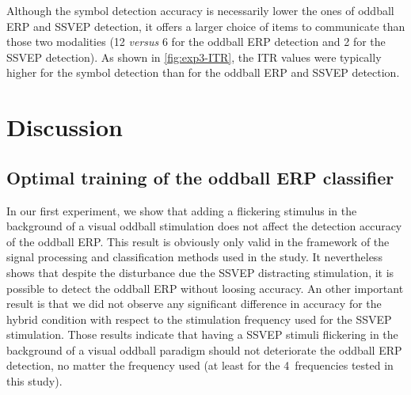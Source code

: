 \documentclass[10pt]{article}
\begin{document}
    Although the symbol detection accuracy is necessarily lower the ones of oddball ERP and SSVEP detection, it offers a larger choice of items to communicate than those two modalities (12 \emph{versus} 6 for the oddball ERP detection and 2 for the SSVEP detection).
    As shown in \autoref{fig:exp3-ITR}, the ITR values were typically higher for the symbol detection than for the oddball ERP and SSVEP detection.



\section{Discussion}
\label{sec:4Discuss}

    \subsection{Optimal training of the oddball ERP classifier}
    \label{sec:4Discuss1}
    In our first experiment, we show that adding a flickering stimulus in the background of a visual oddball stimulation does not affect the detection accuracy of the oddball ERP.
    This result is obviously only valid in the framework of the signal processing and classification methods used in the study.
    It nevertheless shows that despite the disturbance due the SSVEP distracting stimulation, it is possible to detect the oddball ERP without loosing accuracy.
    An other important result is that we did not observe any significant difference in accuracy for the hybrid condition with respect to the stimulation frequency used for the SSVEP stimulation.
    Those results indicate that having a SSVEP stimuli flickering in the background of a visual oddball paradigm should not deteriorate the oddball ERP detection, no matter the frequency used (at least for the 4~frequencies tested in this study).
\end{document}
